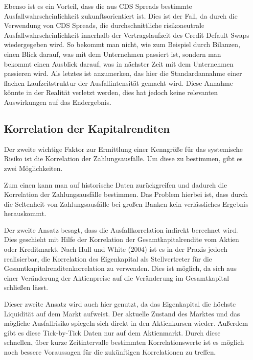 \documentclass[a4paper,12pt]{scrartcl}
\begin{document}
Ebenso ist es ein Vorteil, dass die aus CDS Spreads bestimmte Ausfallwahrscheinlichkeit zukunftsorientiert ist. Dies ist der Fall, da durch die Verwendung von CDS Spreads, die durchschnittliche risikoneutrale Ausfallwahrscheinlichkeit innerhalb der Vertragslaufzeit des Credit Default Swaps wiedergegeben wird. 
So bekommt man nicht, wie zum Beispiel durch Bilanzen, einen Blick darauf, was mit dem Unternehmen passiert ist, sondern man bekommt einen Ausblick darauf, was in nächster Zeit mit dem Unternehmen passieren wird.
Als letztes ist anzumerken, das hier die Standardannahme einer flachen Laufzeitstruktur der Ausfallintensität gemacht wird. Diese Annahme könnte in der Realität verletzt werden, dies hat jedoch keine relevanten Auswirkungen auf das Endergebnis.

\subsection{Korrelation der Kapitalrenditen}
Der zweite wichtige Faktor zur Ermittlung einer Kenngröße für das systemische Risiko ist die Korrelation der Zahlungsausfälle. Um diese zu bestimmen, gibt es zwei Möglichkeiten. 

Zum einen kann man auf historische Daten zurückgreifen und dadurch die Korrelation der Zahlungsausfälle bestimmen. Das Problem hierbei ist, dass durch die Seltenheit von Zahlungsausfälle bei großen Banken kein verlässliches Ergebnis herauskommt. 

Der zweite Ansatz besagt, dass die Ausfallkorrelation indirekt berechnet wird. Dies geschieht mit Hilfe der Korrelation der Gesamtkapitalrendite vom Aktien oder Kreditmarkt. Nach Hull und White (2004) ist es in der Praxis jedoch realisierbar, die Korrelation des Eigenkapital als Stellvertreter für die Gesamtkapitalrenditenkorrelation zu verwenden. Dies ist möglich, da sich aus einer Veränderung der Aktienpreise auf die Veränderung im Gesamtkapital schließen lässt.

Dieser zweite Ansatz wird auch hier genutzt, da das Eigenkapital die höchste Liquidität auf dem Markt aufweist. Der aktuelle Zustand des Marktes und das mögliche Ausfallrisiko spiegeln sich direkt in den Aktienkursen wieder. Außerdem gibt es diese Tick-by-Tick Daten nur auf dem Aktienmarkt. 
Durch diese schnellen, über kurze Zeitintervalle bestimmten Korrelationswerte ist es möglich noch bessere Voraussagen für die zukünftigen Korrelationen zu treffen. 
\end{document}
